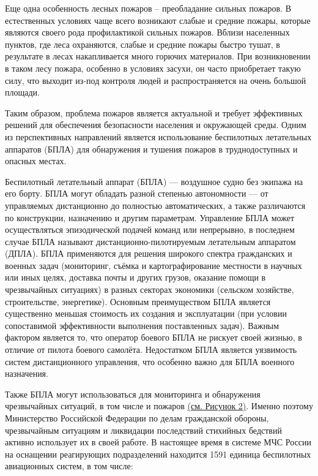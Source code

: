     Еще одна особенность лесных пожаров – преобладание сильных пожаров. В естественных условиях чаще всего возникают слабые и средние пожары, которые являются своего рода профилактикой сильных пожаров. Вблизи населенных пунктов, где леса охраняются, слабые и средние пожары быстро тушат, в результате в лесах накапливается много горючих материалов. При возникновении в таком лесу пожара, особенно в условиях засухи, он часто приобретает такую силу, что выходит из-под контроля людей и распространяется на очень большой площади.

    Таким образом, проблема пожаров является актуальной и требует эффективных решений для обеспечения безопасности населения и окружающей среды. Одним из перспективных направлений является использование беспилотных летательных аппаратов (БПЛА) для обнаружения и тушения пожаров в труднодоступных и опасных местах.

    Беспилотный летательный аппарат (БПЛА) — воздушное судно без экипажа на его борту. БПЛА могут обладать разной степенью автономности — от управляемых дистанционно до полностью автоматических, а также различаются по конструкции, назначению и другим параметрам. Управление БПЛА может осуществляться эпизодической подачей команд или непрерывно, в последнем случае БПЛА называют дистанционно-пилотируемым летательным аппаратом (ДПЛА). БПЛА применяются для решения широкого спектра гражданских и военных задач (мониторинг, съёмка и картографирование местности в научных или иных целях, доставка почты и других грузов, оказание помощи в чрезвычайных ситуациях) в разных секторах экономики (сельском хозяйстве, строительстве, энергетике). Основным преимуществом БПЛА является существенно меньшая стоимость их создания и эксплуатации (при условии сопоставимой эффективности выполнения поставленных задач). Важным фактором является то, что оператор боевого БПЛА не рискует своей жизнью, в отличие от пилота боевого самолёта. Недостатком БПЛА является уязвимость систем дистанционного управления, что особенно важно для БПЛА военного назначения. 

    Также БПЛА могут использоваться для мониторинга и обнаружения чрезвычайных ситуаций, в том числе и пожаров \hyperref[fig:EMERCOM_drone]{(см. Рисунок 2)}. Именно поэтому Министерство Российской Федерации по делам гражданской обороны, чрезвычайным ситуациям и ликвидации последствий стихийных бедствий активно использует их в своей работе. В настоящее время в системе МЧС России на оснащении реагирующих подразделений находится 1591 единица беспилотных авиационных систем, в том числе:

